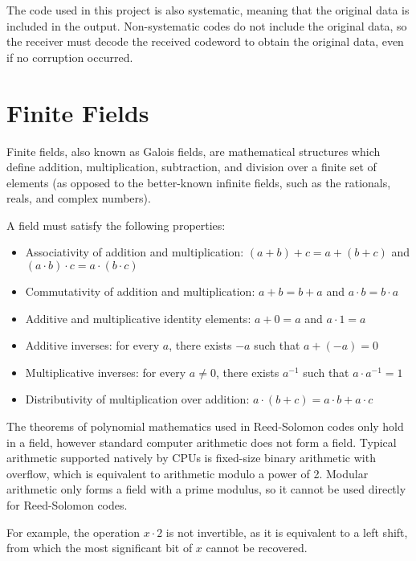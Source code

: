 The code used in this project is also systematic, meaning that the original data is included in the output.
Non-systematic codes do not include the original data, so the receiver must decode the received codeword to obtain the original data, even if no corruption occurred.

\section{Finite Fields}

Finite fields, also known as Galois fields, are mathematical structures which define addition, multiplication, subtraction, and division over a finite set of elements \cite{finite-fields-2nd-ed}
(as opposed to the better-known infinite fields, such as the rationals, reals, and complex numbers).

A field must satisfy the following properties:

\begin{itemize}[nosep]
    \item Associativity of addition and multiplication: $(a + b) + c = a + (b + c)$ and $(a \cdot b) \cdot c = a \cdot (b \cdot c)$
    \item Commutativity of addition and multiplication: $a + b = b + a$ and $a \cdot b = b \cdot a$
    \item Additive and multiplicative identity elements: $a + 0 = a$ and $a \cdot 1 = a$
    \item Additive inverses: for every $a$, there exists $-a$ such that $a + (-a) = 0$
    \item Multiplicative inverses: for every $a \neq 0$, there exists $a^{-1}$ such that $a \cdot a^{-1} = 1$
    \item Distributivity of multiplication over addition: $a \cdot (b + c) = a \cdot b + a \cdot c$
\end{itemize}

The theorems of polynomial mathematics used in Reed-Solomon codes only hold in a field, however standard computer arithmetic does not form a field.
Typical arithmetic supported natively by CPUs is fixed-size binary arithmetic with overflow, which is equivalent to arithmetic modulo a power of 2.
Modular arithmetic only forms a field with a prime modulus, so it cannot be used directly for Reed-Solomon codes.

For example, the operation $x \cdot 2$ is not invertible, as it is equivalent to a left shift, from which the most significant bit of $x$ cannot be recovered.

